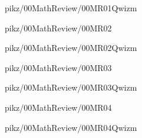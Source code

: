 \documentclass[9pt,xcolor={svgnames, x11names}]{beamer}
\begin{document}

\begin{frame}{pikz/00MathReview/00MR01Qwizm}
    \resizebox{0.75\textwidth}{!}{%
    
  }
\end{frame}


\begin{frame}{pikz/00MathReview/00MR02}
  \resizebox{0.75\textwidth}{!}{%
    
  }
\end{frame}

\begin{frame}{pikz/00MathReview/00MR02Qwizm}
  \resizebox{0.75\textwidth}{!}{%
  
}
\end{frame}



\begin{frame}{pikz/00MathReview/00MR03}  
   
\end{frame}


\begin{frame}{pikz/00MathReview/00MR03Qwizm}
  
\end{frame}


\begin{frame}{pikz/00MathReview/00MR04}
  \resizebox{0.5\textwidth}{!}{%
    
  }
\end{frame}


\begin{frame}{pikz/00MathReview/00MR04Qwizm}
  
\end{frame}
\end{document}

